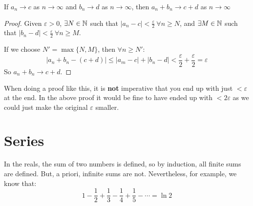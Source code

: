 \documentclass[../main.tex]{subfiles}
\begin{document}
\begin{proposition}
  If $a_n \to c$ as $n \to \infty$ and $b_n \to d$ as $n \to \infty$, then $a_n + b_n \to c + d$ as $n \to \infty$
\end{proposition}
\begin{proof}
  Given $\varepsilon > 0$, $\exists N \in \mathbb{N}$ such that $|a_n - c| < \frac{\varepsilon}{2}\ \forall n \geq N$, and $\exists M \in \mathbb{N}$ such that $|b_n - d| < \frac{\varepsilon}{2}\ \forall n \geq M$.

  If we choose $N' = \max\{N, M\}$, then $\forall n \geq N'$:
  \[
    |a_n + b_n - (c + d)| \leq |a_m - c| + |b_n - d| < \frac{\varepsilon}{2} + \frac{\varepsilon}{2} = \varepsilon
  \]
  So $a_n + b_n \to c + d$.
\end{proof}
\begin{remark}[Note]
  When doing a proof like this, it is \textbf{not} imperative that you end up with just $< \varepsilon$ at the end.
  In the above proof it would be fine to have ended up with $< 2\varepsilon$ as we could just make the original $\varepsilon$ smaller.
\end{remark}
\section{Series}
In the reals, the sum of two numbers is defined, so by induction, all finite sums are defined.
But, a priori, infinite sums are not.
Nevertheless, for example, we know that:
\[
  1 - \frac{1}{2} + \frac{1}{3} - \frac{1}{4} + \frac{1}{5} - \cdots = \ln 2
\]
\end{document}
